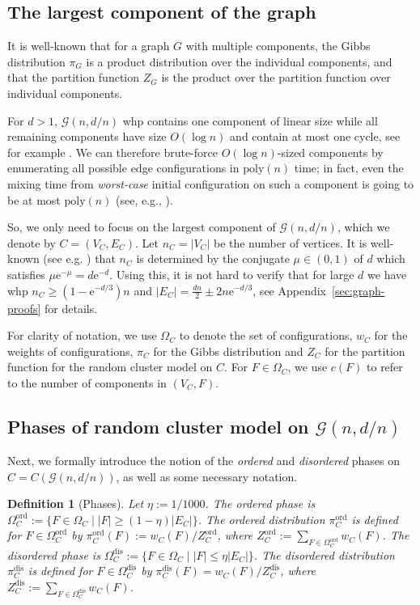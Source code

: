 \documentclass[11pt]{article}
\theoremstyle{plain}
\newtheorem{definition}[theorem]{Definition}
\newcommand{\G}{\mathcal{G}}
\newcommand{\emm}{\mathrm{e}}
\newcommand{\1}{\mathbb{1}}
\newcommand{\ord}{\mathrm{ord}}
\newcommand{\dis}{\mathrm{dis}}
\begin{document}
\subsection{The largest component of the graph}
 
It is well-known that for a graph $G$   with multiple components, the Gibbs distribution $\pi_G$ is a product distribution over the individual components, and that the partition function \(Z_G\) is the product over the partition function over individual components. 

For \(d > 1\), \(\G(n,d/n)\) whp contains one component of linear size while all remaining components have size \(O(\log n)\) and contain at most one cycle, see for example \cite[Section 5]{random-graphs-janson-book}.    We can therefore brute-force \(O(\log n)\)-sized components by enumerating all possible edge configurations in $\text{poly}(n)$ time; in fact, even  the mixing time from \textit{worst-case} initial configuration on such a component is going to be at most $\text{poly}(n)$ (see, e.g., \cite[Lemma 6.7]{blanca2021random}). 

 So, we only need to focus on the largest component of \(\G(n,d/n)\), which we denote by \(C = (V_C,E_C)\). Let \(n_C = |V_C|\) be the number of vertices. It is well-known (see e.g. \cite[Theorem 5.4]{random-graphs-janson-book}) that \(n_C\) is determined by the conjugate $\mu\in (0,1)$ of \(d\) which satisfies $\mu \emm^{-\mu}=d \emm^{-d}$. Using this, it is not hard to verify that for large $d$ we have whp \(n_C\geq(1-\emm^{-d/3})n\) and $|E_C|= \frac{dn}{2}\pm 2n \emm^{-d/3}$, see Appendix~\ref{sec:graph-proofs} for details.

For clarity of notation, we use \(\Omega_C\) to denote the set of configurations, \(w_C\) for the weights of configurations, \(\pi_C\) for the Gibbs distribution and \(Z_C\) for the partition function for the random cluster model on \(C\). For \(F\in\Omega_C\), we use \(c(F)\) to refer to the number of components in \((V_C,F)\).
 
\subsection{Phases of random cluster model on \(\G(n,d/n)\)}

Next, we formally introduce the notion of the \textit{ordered} and \textit{disordered} phases on \(C=C(\G(n,d/n))\), as well as some necessary notation.

\begin{definition}[Phases]\label{def:phases}
Let \(\eta := {1}/{1000}\).
The \emph{ordered phase} is \(\Omega^\ord_C := \{F\in\Omega_C \mid |F|\geq (1-\eta)|E_C|\}\). The  ordered distribution $\pi^\ord_C$  is defined for $F\in \Omega_C^\ord$ by $\pi^\ord_C(F) := {w_C(F)}/{Z^\ord_C}$, where \(Z^\ord_C := \sum_{F\in\Omega^\ord_C}w_C(F)\).
The \emph{disordered phase} is \(\Omega^\dis_C := \{F\in\Omega_C \mid |F| \leq \eta|E_C|\}\). The disordered distribution $\pi^\dis_C$ is defined for $F\in \Omega_C^\dis$ by $\pi^\dis_C(F) = {w_C(F)}/{Z^\dis_C}$, where \(Z^\dis_C := \sum_{F\in\Omega^\dis_C}w_C(F)\).
\end{definition}
\end{document}
